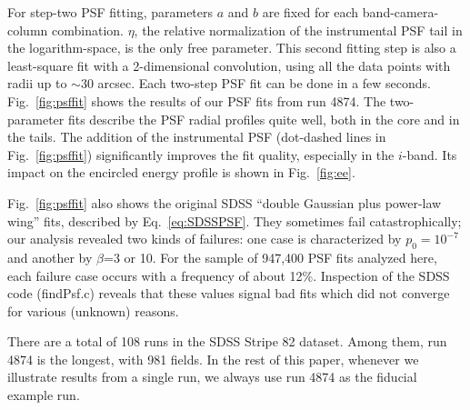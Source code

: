 For step-two PSF fitting, parameters $a$ and $b$ are
fixed for each band-camera-column combination.
$\eta$, the relative normalization of the instrumental PSF
tail in the logarithm-space, is the only free
parameter.
This second fitting step is also a least-square fit with a
2-dimensional convolution, using all the data points
with radii up to $\sim$30 arcsec.
Each two-step PSF fit can be done in a few seconds.
Fig.~\ref{fig:psffit} shows the results of our PSF fits from run 4874. The two-parameter
fits describe the PSF radial profiles quite well, both in the core and
in the tails. The addition of the instrumental PSF 
(dot-dashed lines in Fig.~\ref{fig:psffit})
significantly improves the fit quality, 
especially in the $i$-band. 
Its impact on the encircled energy profile is shown in Fig.~\ref{fig:ee}.

Fig.~\ref{fig:psffit} also shows the original SDSS ``double Gaussian plus power-law wing'' fits,
described by Eq.~\ref{eq:SDSSPSF}. They sometimes fail catastrophically; our analysis revealed
two kinds of failures: one case is characterized by $p_0 =10^{-7}$ and
another by $\beta$=3 or 10.
For the sample of 947,400 PSF fits analyzed here, each failure case occurs with a frequency of about 12\%. 
Inspection of the SDSS code (findPsf.c) reveals that these values signal bad fits which did not 
converge for various (unknown) reasons. 

There are a total of 108 runs in the SDSS Stripe 82 dataset. Among them, run 4874 is the longest, 
with 981 fields. In the rest of this paper, whenever we illustrate results from a single run, 
we always use run 4874 as the fiducial example run. 



